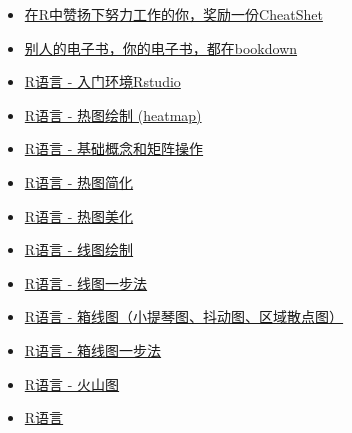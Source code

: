 \documentclass[]{article}
\providecommand{\tightlist}{%
  \setlength{\itemsep}{0pt}\setlength{\parskip}{0pt}}
\numberwithin{figure}{section}
\numberwithin{table}{section}
\theoremstyle{definition}
\theoremstyle{definition}
\theoremstyle{definition}
\theoremstyle{remark}
\begin{document}
\begin{itemize}
\tightlist
\item
  \href{http://mp.weixin.qq.com/s/x3tWrQPriLRFXO8ZaD93EQ}{在R中赞扬下努力工作的你，奖励一份CheatShet}
\item
  \href{http://mp.weixin.qq.com/s/u8WfC4xQ562Uekhs4WVBoQ}{别人的电子书，你的电子书，都在bookdown}
\item
  \href{http://mp.weixin.qq.com/s?__biz=MzI5MTcwNjA4NQ==\&mid=2247483882\&idx=1\&sn=e16903b4b745a1ef51855be3824149f6\&chksm=ec0dc460db7a4d76a70bd4ca2d250f147225252ee963d3e577affaebeeb81dea1ff639d5e9aa\#rd}{R语言
  - 入门环境Rstudio}
\item
  \href{http://mp.weixin.qq.com/s/mNSkf1rjWTCtE1pIOuI2rA}{R语言 -
  热图绘制 (heatmap)}
\item
  \href{http://mp.weixin.qq.com/s?__biz=MzI5MTcwNjA4NQ==\&mid=2247483891\&idx=1\&sn=40daf6435398c4d9a41f332e9bba4915\&chksm=ec0dc479db7a4d6fec413bfb90a4660eb035b440d2bbee998114f7af29e3b3338a8adf62540a\#rd}{R语言
  - 基础概念和矩阵操作}
\item
  \href{https://mp.weixin.qq.com/s/_9LKs6t6rcjzokF_0gneSA}{R语言 -
  热图简化}
\item
  \href{http://mp.weixin.qq.com/s/lKrhvYrwn93esC6MA3bHWw}{R语言 -
  热图美化}
\item
  \href{http://mp.weixin.qq.com/s/YB-9tE4ut9RN0yfS8qBhtQ}{R语言 -
  线图绘制}
\item
  \href{http://mp.weixin.qq.com/s?__biz=MzI5MTcwNjA4NQ==\&mid=2247483947\&idx=1\&sn=7cf0252efff5433447507b977fcaff97\&chksm=ec0dc7a1db7a4eb77a269709bdf2c8ab51bcad89aa780ec0be171a333e1cb8f3cc27eff277a1\#rd}{R语言
  - 线图一步法}
\item
  \href{http://mp.weixin.qq.com/s?__biz=MzI5MTcwNjA4NQ==\&mid=2247483964\&idx=1\&sn=ee52ac37fb9a919f5c75c0abe2a49ad4\&chksm=ec0dc7b6db7a4ea0a51306347fc43265c41fda3eeaf4764ddc3795546371327579676cd74a38\#rd}{R语言
  - 箱线图（小提琴图、抖动图、区域散点图）}
\item
  \href{http://mp.weixin.qq.com/s?__biz=MzI5MTcwNjA4NQ==\&mid=2247483971\&idx=1\&sn=1b40a1137ccb8b2fa1ab3eb1d0f05de9\&chksm=ec0dc7c9db7a4edf16ea4966b9acb7f23cd23bd6a2e59450ae11bdac899fa2fceb124264dcf4\#rd}{R语言
  - 箱线图一步法}
\item
  \href{http://mp.weixin.qq.com/s?__biz=MzI5MTcwNjA4NQ==\&mid=2247483996\&idx=1\&sn=9a29d52e78e9acffeb0a78077a14f9f2\&chksm=ec0dc7d6db7a4ec0163259e81e4ded54875a5dd8adaafbc6975a86c71223d863627ba37801e5\#rd}{R语言
  - 火山图}
\item
  \href{http://mp.weixin.qq.com/s?__biz=MzI5MTcwNjA4NQ==\&mid=2247483978\&idx=1\&sn=e0c158c0e92375553036cc37f4987e40\&chksm=ec0dc7c0db7a4ed6ac593493b7d8b52f11f2feb92d24fa00d19527fbb6f95b24f7e313ef9440\#rd}{R语言
}
\end{itemize}
\end{document}
